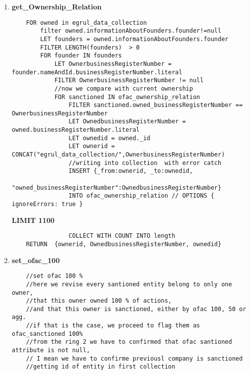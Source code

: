 \begin{enumerate}
	
	\item \textbf{get\_Ownership\_Relation}\label{query7}
	\begin{verbatim}
	FOR owned in egrul_data_collection
	    filter owned.informationAboutFounders.founder!=null
	    LET founders = owned.informationAboutFounders.founder
	    FILTER LENGTH(founders)  > 0
	    FOR founder IN founders
	        LET OwnerbusinessRegisterNumber = founder.nameAndId.businessRegisterNumber.literal
	        FILTER OwnerbusinessRegisterNumber != null
	        //now we compare with current ownership
	        FOR sanctioned IN ofac_ownership_relation
	            FILTER sanctioned.owned_businessRegisterNumber == OwnerbusinessRegisterNumber
	            LET OwnedbusinessRegisterNumber = owned.businessRegisterNumber.literal
	            LET ownedid = owned._id
	            LET ownerid = CONCAT("egrul_data_collection/",OwnerbusinessRegisterNumber)
	            //writing into collection  with error catch
	            INSERT {_from:ownerid, _to:ownedid,
	            "owned_businessRegisterNumber":OwnedbusinessRegisterNumber} 
	            INTO ofac_ownership_relation // OPTIONS { ignoreErrors: true }
	            	\end{verbatim}
	          \textbf{LIMIT 1100} 
	        	\begin{verbatim}   
	            COLLECT WITH COUNT INTO length
	RETURN  {ownerid, OwnedbusinessRegisterNumber, ownedid}
		            	\end{verbatim}

	\item \textbf{set\_ofac\_100}\label{query8}
	
		\begin{verbatim}
	//set ofac 100 %
	//here we revise every santioned entity belong to only one owner,
	//that this owner owned 100 % of actions, 
	//and that this owner is sanctioned, either by ofac 100, 50 or agg.
	//if that is the case, we proceed to flag them as ofac_sanctioned 100%
	//from the ring 2 we have to confirmed that ofac santioned attribute is not null,
	// I mean we have to confirme previousl company is sanctioned
	//getting id of entity in first collection
	

\end{verbatim}
\end{enumerate}
